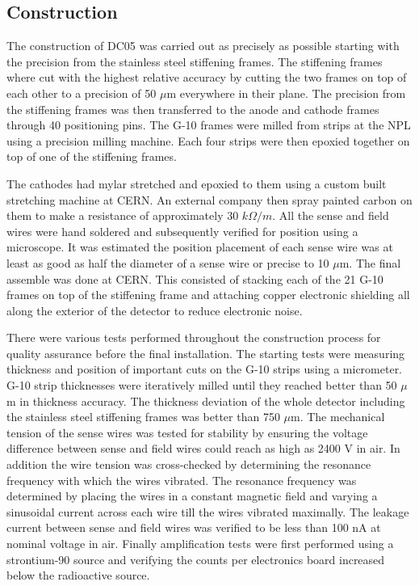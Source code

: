 \documentclass[aps,prl,twocolumn,groupedaddress]{revtex4-1}
\begin{document}
\subsection{Construction}
The construction of DC05 was carried out as precisely as possible starting with the
precision from the stainless steel stiffening frames.  The stiffening frames
where cut with the highest relative accuracy by cutting the two frames on top of
each other to a precision of 50 $\mu$m everywhere in their plane.  The precision
from the stiffening frames was then transferred to the anode and cathode frames
through 40 positioning pins.  The G-10 frames were milled from strips at the NPL
using a precision milling machine.  Each four strips were then epoxied together
on top of one of the stiffening frames.  \par The cathodes had mylar stretched
and epoxied to them using a custom built stretching machine at CERN.  An
external company then spray painted carbon on them to make a resistance of
approximately 30 $k\Omega /m$.  All the sense and field wires were hand soldered
and subsequently verified for position using a microscope.  It was estimated the
position placement of each sense wire was at least as good as half the diameter
of a sense wire or precise to 10 $\mu$m.  The final assemble was done at CERN.
This consisted of stacking each of the 21 G-10 frames on top of the stiffening
frame and attaching copper electronic shielding all along the exterior of the
detector to reduce electronic noise. \par There were various tests performed
throughout the construction process for quality assurance before the final
installation.  The starting tests were measuring thickness and position of
important cuts on the G-10 strips using a micrometer.  G-10 strip thicknesses
were iteratively milled until they reached better than 50 $\mu$m in thickness
accuracy.  The thickness deviation of the whole detector including the stainless
steel stiffening frames was better than 750 $\mu$m.  The mechanical tension of the sense
wires was tested for stability by ensuring the voltage difference between sense
and field wires could reach as high as 2400 V in air.  In addition the wire
tension was cross-checked by determining the resonance frequency with which the
wires vibrated.  The resonance frequency was determined by placing the wires in
a constant magnetic field and varying a sinusoidal current across each wire till
the wires vibrated maximally.  The leakage current between sense and field wires
was verified to be less than 100 nA at nominal voltage in air.  Finally
amplification tests were first performed using a strontium-90 source and
verifying the counts per electronics board increased below the radioactive source.
\end{document}
